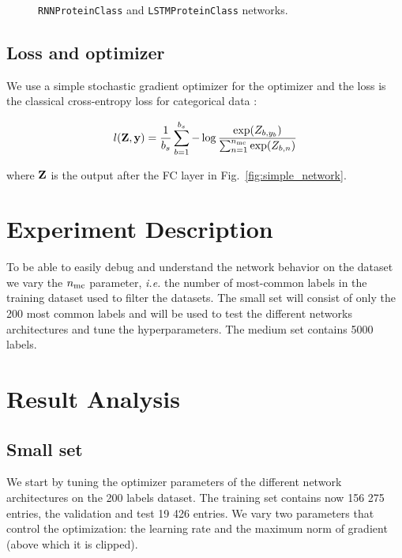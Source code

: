 \documentclass[12pt]{article}
\begin{document}
\begin{figure}[htbp]
    \centering
    
    \caption{\texttt{RNNProteinClass} and \texttt{LSTMProteinClass} networks.}
    \label{fig:medium_network}
\end{figure}

\subsection{Loss and optimizer}

We use a simple stochastic gradient optimizer \citep{ruder2016} for the optimizer and the loss is the classical cross-entropy loss for categorical data \citep[Chap. 4]{bishop}:

\begin{equation}
    l(\vb{Z}, \vb{y}) = \frac{1}{b_s} \sum_{b=1}^{b_s} - \log \frac{\exp(Z_{b, y_b})}{\sum_{n=1}^{n_\mathrm{mc}} \exp(Z_{b, n})}
\end{equation}

\noindent where $\vb{Z}$ is the output after the FC layer in Fig.~\ref{fig:simple_network}.

\section{Experiment Description}

To be able to easily debug and understand the network behavior on the dataset we vary the $n_\mathrm{mc}$ parameter, \textit{i.e.} the number of most-common labels in the training dataset used to filter the datasets. The small set will consist of only the 200 most common labels and will be used to test the different networks architectures and tune the hyperparameters. The medium set contains 5000 labels.

\section{Result Analysis}

\subsection{Small set}

We start by tuning the optimizer parameters of the different network architectures on the 200 labels dataset. The training set contains now 156 275 entries, the validation and test 19 426 entries. We vary two parameters that control the optimization: the learning rate and the maximum norm of gradient (above which it is clipped).
\end{document}
